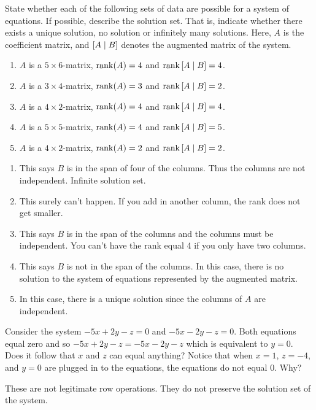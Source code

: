 \begin{ex}
  State whether each of the following sets of data are
  possible for a system of equations. If possible, describe the
  solution set.  That is, indicate whether there exists a unique
  solution, no solution or infinitely many solutions. Here, $A$ is
  the coefficient matrix, and $\left[A\mid B\right]$ denotes the
  augmented matrix of the system.

  \begin{enumerate}
  \item $A$ is a $5\times 6$-matrix, $\rank(A) =4$ and
    $\rank\mat{A\mid B} =4$.

  \item $A$ is a $3\times 4$-matrix, $\rank(A) =3$ and
    $\rank\mat{A\mid B} =2$.

  \item $A$ is a $4\times 2$-matrix, $\rank(A) =4$ and
    $\rank\mat{A\mid B} =4$.

  \item $A$ is a $5\times 5$-matrix, $\rank(A) =4$ and
    $\rank\mat{A\mid B} =5$.

  \item $A$ is a $4\times 2$-matrix, $\rank(A) =2$ and
    $\rank\mat{A\mid B} =2$.
  \end{enumerate}

  \begin{sol}
    \begin{enumerate}
    \item This says $B$ is in the span of four of the columns. Thus the columns are not independent. Infinite solution set.
    \item This surely can't happen. If you add in another column, the rank does not get smaller.
    \item This says $B$ is in the span of the columns and the columns must be
      independent. You can't have the rank equal 4 if you only have two columns.
    \item This says $B$ is not in the span of the columns. In this case, there is no solution to the system of equations represented by the augmented matrix.
    \item In this case, there is a
      unique solution since the columns of $A$ are independent.
    \end{enumerate}
  \end{sol}
\end{ex}

\begin{ex}
  Consider the system $-5x+2y-z=0$ and $-5x-2y-z=0$. Both equations
  equal zero and so $-5x+2y-z=-5x-2y-z$ which is equivalent to $y=0$. Does it follow that $x$
  and $z$ can equal anything?  Notice that when $x=1$, $z=-4$, and $y=0$ are plugged in
  to the equations, the equations do not equal $0$. Why?
  \begin{sol}
    These are not legitimate row
    operations. They do not preserve the solution set of the system.
  \end{sol}
\end{ex}

